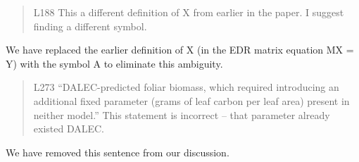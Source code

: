 \begin{quote}
L188 This a different definition of X from earlier in the paper. I suggest finding a different symbol.
\end{quote}

We have replaced the earlier definition of X (in the EDR matrix equation MX = Y) with the symbol A to eliminate this ambiguity.

\begin{quote}
L273 “DALEC-predicted foliar biomass, which required introducing an additional fixed parameter (grams of leaf carbon per leaf area) present in neither model.” This statement is incorrect – that parameter already existed DALEC.
\end{quote}

We have removed this sentence from our discussion.
